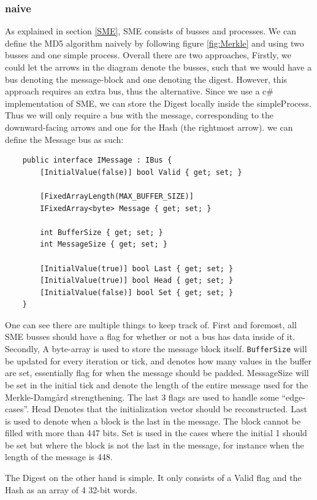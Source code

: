 \documentclass[a4paper]{article}
\begin{document}
\subsubsection{naive}
\label{MD5naive}
As explained in section \ref{SME}, SME consists of busses and processes. We can define the MD5 algorithm naively by following figure \ref{fig:Merkle} and using two busses and one simple process. Overall there are two approaches,
Firstly, we could let the arrows in the diagram denote the busses, such that we would have a bus denoting the message-block and one denoting the digest. However, this approach requires an extra bus, thus the alternative. Since we use a c\# implementation of SME, we can store the Digest locally inside the simpleProcess. Thus we will only require a bus with the message, corresponding to the downward-facing arrows and one for the Hash (the rightmost arrow).
we can define the Message bus as such:
\begin{verbatim}
    public interface IMessage : IBus {
        [InitialValue(false)] bool Valid { get; set; }

        [FixedArrayLength(MAX_BUFFER_SIZE)]
        IFixedArray<byte> Message { get; set; }

        int BufferSize { get; set; }
        int MessageSize { get; set; }

        [InitialValue(true)] bool Last { get; set; }
        [InitialValue(true)] bool Head { get; set; }
        [InitialValue(false)] bool Set { get; set; }
    }
\end{verbatim}
One can see there are multiple things to keep track of. First and foremost, all SME busses should have a flag for whether or not a bus has data inside of it. Secondly, A byte-array is used to store the message block itself. \texttt{BufferSize} will be updated for every iteration or tick, and denotes how many values in the buffer are set, essentially flag for when the message should be padded. MessageSize will be set in the initial tick and denote the length of the entire message used for the Merkle-Damgård strengthening.
The last 3 flags are used to handle some ``edge-cases''.
Head Denotes that the initialization vector should be reconstructed.
Last is used to denote when a block is the last in the message. The block cannot be filled with more than 447 bits.
Set is used in the cases where the initial 1 should be set but where the block is not the last in the message, for instance when the length of the message is 448.

The Digest on the other hand is simple. It only consists of a Valid flag and the Hash as an array of 4 32-bit words.
\end{document}
